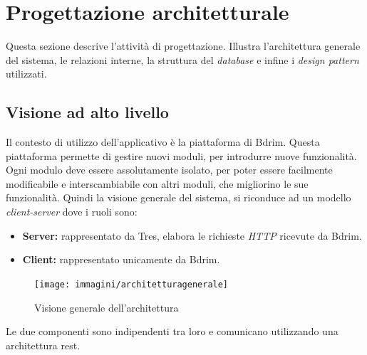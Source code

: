 \newpage
\section{Progettazione architetturale}
Questa sezione descrive l'attività di progettazione. Illustra l'architettura generale del sistema, le relazioni interne, la struttura del \emph{database} e infine i \emph{design pattern} utilizzati.
\subsection{Visione ad alto livello}
Il contesto di utilizzo dell'applicativo è la piattaforma di Bdrim. Questa piattaforma permette di gestire nuovi moduli, per introdurre nuove funzionalità. Ogni modulo deve essere assolutamente isolato, per poter essere facilmente modificabile e interscambiabile con altri moduli, che migliorino le sue funzionalità. Quindi la visione generale del sistema, si riconduce ad un modello \emph{client-server} dove i ruoli sono:
\begin{itemize}
\item \textbf{Server:} rappresentato da Tres, elabora le richieste \emph{HTTP} ricevute da Bdrim.
\item \textbf{Client:} rappresentato unicamente da Bdrim.
\end{itemize}
\begin{figure}[h]
\centering
\texttt{[image: immagini/architetturagenerale]}
\caption{Visione generale dell'architettura}
\label{fig:arch-gen}
\end{figure}
Le due componenti sono indipendenti tra loro e comunicano utilizzando una architettura \gls{rest}.
\newpage
